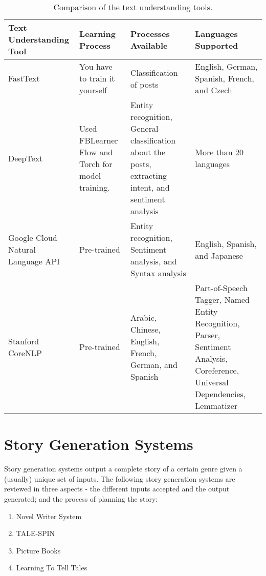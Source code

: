 \clearpage
\begin{table}[ph!]   %
\centering
\caption{Comparison of the text understanding tools.} \vspace{0.25em}
\begin{tabular}{|p{1in}|p{1.5in}|p{1.5in}|p{1in}|} \hline
\centering Text Understanding Tool & Learning Process & Processes Available & Languages Supported \\ \hline
FastText & You have to train it yourself & Classification of posts & English, German, Spanish, French, and Czech \\ \hline
DeepText & Used FBLearner Flow and Torch for model training. & Entity recognition, General classification about the posts, extracting intent, and sentiment analysis & More than 20 languages \\ \hline
Google Cloud Natural Language API & Pre-trained & Entity recognition, Sentiment analysis, and Syntax analysis & English, Spanish, and Japanese \\ \hline
Stanford CoreNLP & Pre-trained & Arabic, Chinese, English, French, German, and Spanish & Part-of-Speech Tagger, Named Entity Recognition, Parser, Sentiment Analysis, Coreference, Universal Dependencies, Lemmatizer \\ \hline
\end{tabular}
\label{tab:TextUnderstandingTool}
\end{table}

\section{Story Generation Systems}
Story generation systems output a complete story of a certain genre given a (usually) unique set of inputs. The following story generation systems are reviewed in three aspects - the different inputs accepted and the output generated; and the process of planning the story:
\begin{enumerate}
\item Novel Writer System \cite{Gervas2012, Gervas2009, MendezGervasDeleon2014, LaclaustraLedesmaMendezGervas2014}
\item TALE-SPIN \cite{Gervas2009, Mawhorter2013, Meehan1977}
\item Picture Books \cite{SolisSiyTabiraoOng2009, angenhancing, picbooks4}
\item Learning To Tell Tales \cite{McIntyreLapata2009}
\end{enumerate}


